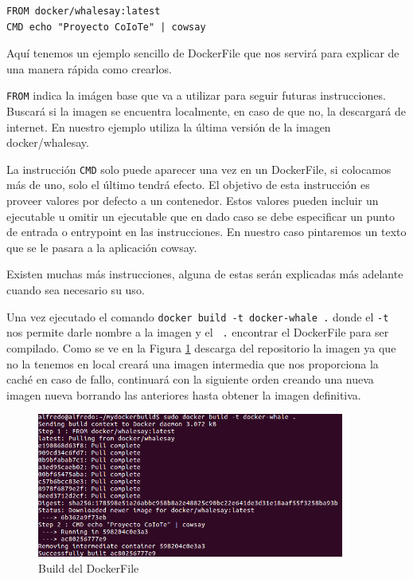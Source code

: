 \begin{verbatim}
FROM docker/whalesay:latest
CMD echo "Proyecto CoIoTe" | cowsay
\end{verbatim}

Aquí tenemos un ejemplo sencillo de DockerFile que nos servirá para explicar de una manera rápida como crearlos. 

\texttt{FROM} indica la imágen base que va a utilizar para seguir futuras instrucciones. Buscará si la imagen se encuentra localmente, en caso de que no, la descargará de internet. En nuestro ejemplo utiliza la última versión de la imagen docker/whalesay.

La instrucción \texttt{CMD} solo puede aparecer una vez en un DockerFile, si colocamos más de uno, solo el último tendrá efecto. El objetivo de esta instrucción es proveer valores por defecto a un contenedor. Estos valores pueden incluir un ejecutable u omitir un ejecutable que en dado caso se debe especificar un punto de entrada o entrypoint en las instrucciones. En nuestro caso pintaremos un texto que se le pasara a la aplicación cowsay.

Existen muchas más instrucciones, alguna de estas serán explicadas más adelante cuando sea necesario su uso. 

Una vez ejecutado el comando \texttt{docker build -t docker-whale .} donde el \texttt{-t} nos permite darle nombre a la imagen y el \texttt{ .} encontrar el DockerFile para ser compilado. Como se ve en la Figura \ref{Build:BuildDockerFile} descarga del repositorio la imagen ya que no la tenemos en local creará una imagen intermedia que nos proporciona la caché en caso de fallo, continuará con la siguiente orden creando una nueva imagen nueva borrando las anteriores hasta obtener la imagen definitiva. 
 
\begin{figure}[htb]
\begin{center}
\includegraphics[width=0.90\textwidth]{./setup/DockerBuildWale}
\caption{Build del DockerFile}
\label{Build:BuildDockerFile}
\end{center}
\end{figure}
 
